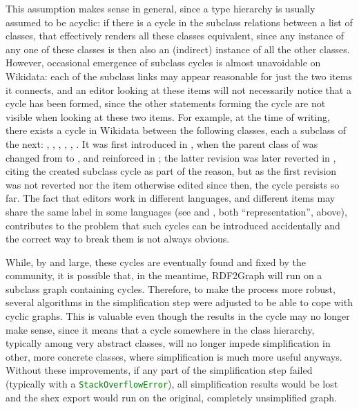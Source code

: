 This assumption makes sense in general,
since a type hierarchy is usually assumed to be acyclic:
if there is a cycle in the subclass relations between a list of classes,
that effectively renders all these classes equivalent,
since any instance of any one of these classes
is then also an (indirect) instance of all the other classes.
However, occasional emergence of subclass cycles is almost unavoidable on \gls{Wikidata}:
each of the subclass links may appear reasonable for just the two \glspl{item} it connects,
and an editor looking at these \glspl{item} will not necessarily notice that a cycle has been formed,
since the other statements forming the cycle are not visible when looking at these two \glspl{item}.
For example, at the time of writing,
there exists a cycle in \gls{Wikidata} between the following classes,
each a subclass of the next:
, , ,
, , .
It was first introduced in ,
when the parent class of 
was changed from  to ,
and reinforced in ;
the latter revision was later reverted in ,
citing the created subclass cycle as part of the reason,
but as the first revision was not reverted nor the \gls{item} otherwise edited since then,
the cycle persists so far.
The fact that editors work in different languages,
and different items may share the same label in some languages
(see  and , both “representation”, above),
contributes to the problem that such cycles can be introduced accidentally
and the correct way to break them is not always obvious.

While, by and large, these cycles are eventually found and fixed by the community,
it is possible that, in the meantime, \gls{RDF2Graph} will run on a subclass graph containing cycles.
Therefore, to make the process more robust,
several algorithms in the simplification step were adjusted to be able to cope with cyclic graphs.
This is valuable even though the results in the cycle may no longer make sense,
since it means that a cycle somewhere in the class hierarchy,
typically among very abstract classes,
will no longer impede simplification in other, more concrete classes,
where simplification is much more useful anyways.
Without these improvements,
if any part of the simplification step failed
(typically with a \lstinline[language=java]{StackOverflowError}),
all simplification results would be lost
and the \gls{shex} export would run on the original, completely unsimplified graph.

